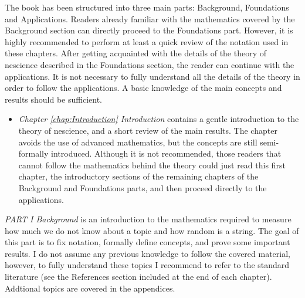 The book has been structured into three main parts: Background, Foundations and Applications. Readers already familiar with the mathematics covered by the Background section can directly proceed to the Foundations part. However, it is highly recommended to perform at least a quick review of the notation used in these chapters. After getting acquainted with the details of the theory of nescience described in the Foundations section, the reader can continue with the applications. It is not necessary to fully understand all the details of the theory in order to follow the applications. A basic knowledge of the main concepts and results should be sufficient.

\bigskip

\begin{itemize}

\item \emph{Chapter \ref{chap:Introduction} Introduction} contains a gentle introduction to the theory of nescience, and a short review of the main results. The chapter avoids the use of advanced mathematics, but the concepts are still semi-formally introduced. Although it is not recommended, those readers that cannot follow the mathematics behind the theory could just read this first chapter, the introductory sections of the remaining chapters of the Background and Foundations parts, and then proceed directly to the applications.

\end{itemize}

\bigskip

\emph{PART I Background} is an introduction to the mathematics required to measure how much we do not know about a topic and how random is a string. The goal of this part is to fix notation, formally define concepts, and prove some important results. I do not assume any previous knowledge to follow the covered material, however, to fully understand these topics I recommend to refer to the standard literature (see the References section included at the end of each chapter). Addtional topics are covered in the appendices.


